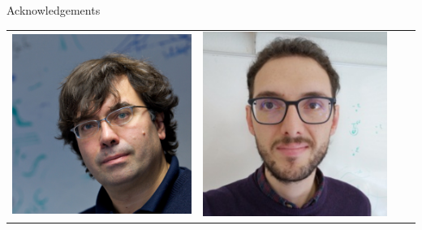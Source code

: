 \documentclass[xcolor=table,aspectratio=169]{beamer}
\numberwithin{equation}{section}
\begin{document}
\begingroup
{}
\begin{frame}{Acknowledgements}
   \begin{center}
      \footnotesize
      \begin{tabularx}{\textwidth}{CCCC}
         \includegraphics[height = 0.3\paperheight]{figures/nicola_marzari.jpg}     &
         \includegraphics[height = 0.3\paperheight]{figures/nicola_colonna2.png}    &

\end{tabularx}
\end{center}
\end{frame}
\end{document}
